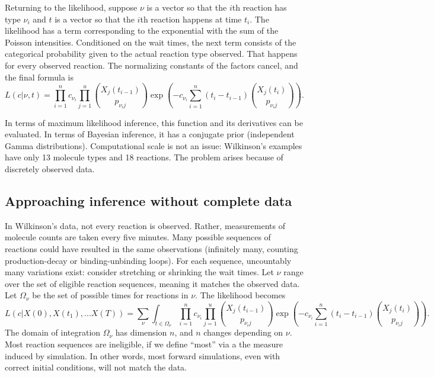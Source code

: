 \documentclass{article}
\begin{document}
Returning to the likelihood, suppose $\nu$ is a vector so that the $i$th reaction has type $\nu_i$ and $t$ is a vector so that the $i$th reaction happens at time $t_i$. The likelihood has a term corresponding to the exponential with the sum of the Poisson intensities. Conditioned on the wait times, the next term consists of the categorical probability given to the actual reaction type observed. That happens for every observed reaction. The normalizing constants of the factors cancel, and the final formula is $$L(c|\nu, t) = \prod_{i=1}^n c_{\nu_{i}} \prod_{j=1}^u {{X_{j}(t_{i-1})}\choose{p_{{\nu_{i}}j}}}\exp\left(-c_{\nu_{i}}\sum_{i=1}^{n} (t_{i}-t_{i-1}) {{X_j(t_{i})}\choose{p_{{\nu_{i}}j}}}\right).$$

In terms of maximum likelihood inference, this function and its derivatives can be evaluated. In terms of Bayesian inference, it has a conjugate prior (independent Gamma distributions). Computational scale is not an issue: Wilkinson's examples have only 13 molecule types and 18 reactions. The problem arises because of discretely observed data.

\subsection{Approaching inference without complete data}
\label{sec:intro_em}
In Wilkinson's data, not every reaction is observed. Rather, measurements of molecule counts are taken every five minutes. Many possible sequences of reactions could have resulted in the same observations (infinitely many, counting production-decay or binding-unbinding loops). For each sequence, uncountably many variations exist: consider stretching or shrinking the wait times. Let $\nu$ range over the set of eligible reaction sequences, meaning it matches the observed data. Let $\Omega_{\nu}$ be the set of possible times for reactions in $\nu$. The likelihood becomes 
\begin{equation}\label{eqn_nasty_lik}
L(c|X(0), X(t_1), ... X(T)) =\sum_{\nu}\int_{t\in \Omega_{\nu}} \prod_{i=1}^n c_{\nu_{i}} \prod_{j=1}^u {{X_{j}(t_{i-1})}\choose{p_{{\nu_{i}}j}}}\exp\left(-c_{\nu_{i}}\sum_{i=1}^{n} (t_{i}-t_{i-1}) {{X_j(t_{i})}\choose{p_{{\nu_{i}}j}}}\right).
\end{equation}
 The domain of integration $\Omega_{\nu}$ has dimension $n$, and $n$ changes depending on $\nu$. Most reaction sequences are ineligible, if we define ``most'' via a the measure induced by simulation. In other words, most forward simulations, even with correct initial conditions, will not match the data. 
\end{document}
